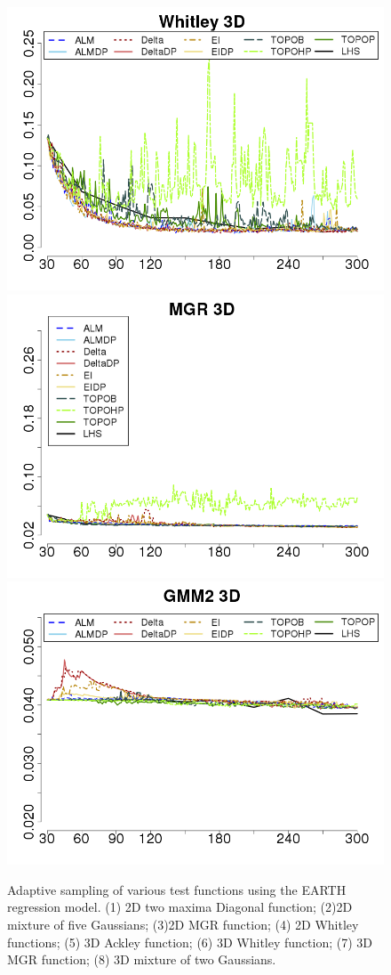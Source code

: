 \begin{figure}[htbp]
\begin{center}
 \includegraphics[width=0.24\linewidth]{figs/chap5/earth_Whitley_td=30}
 \includegraphics[width=0.24\linewidth]{figs/chap5/earth_MGR_td=30}
 \includegraphics[width=0.24\linewidth]{figs/chap5/earth_GMM2_3D_td=30}
 \caption{Adaptive sampling of various test functions using the EARTH regression model.
(1) 2D two maxima Diagonal function;
(2)2D mixture of five Gaussians;
(3)2D MGR function;
(4) 2D Whitley functions;
(5) 3D Ackley function;
(6) 3D Whitley function;
(7) 3D MGR function;
(8) 3D mixture of two Gaussians.}
\label{fig:earth_results}
\end{center}
\end{figure}


